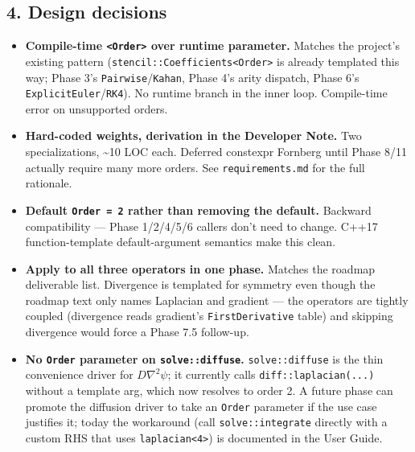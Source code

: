 \subsection{4. Design decisions}\label{design-decisions}

\begin{itemize}
\tightlist
\item
  \textbf{Compile-time \passthrough{\lstinline!<Order>!} over runtime
  parameter.} Matches the project's existing pattern
  (\passthrough{\lstinline!stencil::Coefficients<Order>!} is already
  templated this way; Phase 3's
  \passthrough{\lstinline!Pairwise!}/\passthrough{\lstinline!Kahan!},
  Phase 4's arity dispatch, Phase 6's
  \passthrough{\lstinline!ExplicitEuler!}/\passthrough{\lstinline!RK4!}).
  No runtime branch in the inner loop. Compile-time error on unsupported
  orders.
\item
  \textbf{Hard-coded weights, derivation in the Developer Note.} Two
  specializations, \textasciitilde10 LOC each. Deferred constexpr
  Fornberg until Phase 8/11 actually require many more orders. See
  \passthrough{\lstinline!requirements.md!} for the full rationale.
\item
  \textbf{Default \passthrough{\lstinline!Order = 2!} rather than
  removing the default.} Backward compatibility --- Phase 1/2/4/5/6
  callers don't need to change. C++17 function-template default-argument
  semantics make this clean.
\item
  \textbf{Apply to all three operators in one phase.} Matches the
  roadmap deliverable list. Divergence is templated for symmetry even
  though the roadmap text only names Laplacian and gradient --- the
  operators are tightly coupled (divergence reads gradient's
  \passthrough{\lstinline!FirstDerivative!} table) and skipping
  divergence would force a Phase 7.5 follow-up.
\item
  \textbf{No \passthrough{\lstinline!Order!} parameter on
  \passthrough{\lstinline!solve::diffuse!}.}
  \passthrough{\lstinline!solve::diffuse!} is the thin convenience
  driver for \(D \nabla^2 \psi\); it currently calls
  \passthrough{\lstinline!diff::laplacian(...)!} without a template arg,
  which now resolves to order 2. A future phase can promote the
  diffusion driver to take an \passthrough{\lstinline!Order!} parameter
  if the use case justifies it; today the workaround (call
  \passthrough{\lstinline!solve::integrate!} directly with a custom RHS
  that uses \passthrough{\lstinline!laplacian<4>!}) is documented in the
  User Guide.
\end{itemize}

